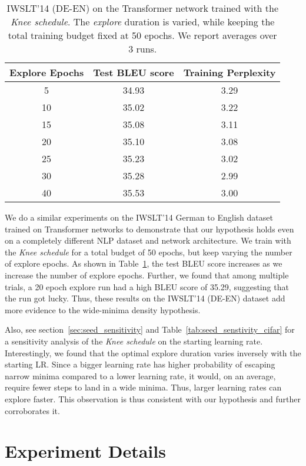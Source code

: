 \documentclass{article} \usepackage{iclr2021_conference,times}
\newcommand{\lrschedule}{\textit{Knee schedule}}
\begin{document}
\begin{table}[h]
\small
\centering
\caption{IWSLT'14 (DE-EN) on the Transformer network trained with the \lrschedule{}. The \textit{explore} duration is varied, while keeping the total training budget fixed at 50 epochs. We report averages over 3 runs.}

\begin{tabular}{ccc}
  \toprule
  Explore Epochs & Test BLEU score & Training Perplexity \\
  \midrule
  5  & 34.93 & 3.29 \\ 
  10 & 35.02 & 3.22 \\ 
  15 & 35.08 & 3.11 \\ 
  20 & 35.10  & 3.08 \\ 
  25 & 35.23 & 3.02 \\ 
  30 & 35.28 & 2.99 \\
  40 & 35.53 & 3.00 \\
  \bottomrule
\end{tabular}
\label{tab:warmup_accuracy_iwslt}
\end{table}

We do a similar experiments on the IWSLT'14 German to English dataset \citep{iwslt_dataset_cettolo2014} trained on Transformer networks \citep{vaswani2017attention} to demonstrate that our hypothesis holds even on a completely different NLP dataset and network architecture. We train with the \lrschedule{} for a total budget of 50 epochs, but keep varying the number of explore epochs. As shown in Table~\ref{tab:warmup_accuracy_iwslt}, the test BLEU score increases as we increase the number of explore epochs. Further, we found that among multiple trials, a 20 epoch explore run had a high BLEU score of 35.29, suggesting that the run got lucky. Thus, these results on the IWSLT'14 (DE-EN) dataset add more evidence to the wide-minima density hypothesis. 

Also, see section~\ref{sec:seed_sensitivity} and Table~\ref{tab:seed_senstivity_cifar} for a sensitivity analysis of the \lrschedule{} on the starting learning rate. Interestingly, we found that the optimal explore duration varies inversely with the starting LR. Since a bigger learning rate has higher probability of escaping narrow minima compared to a lower learning rate, it would, on an average, require fewer steps to land in a wide minima. Thus, larger learning rates can explore faster. This observation is thus consistent with our hypothesis and further corroborates it.

\vspace{20pt} \section{Experiment Details}
\label{sec:experiment_details}
\end{document}
